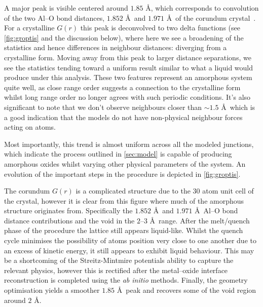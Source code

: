 A major peak is visible centered around $1.85$ \AA, which corresponds to convolution of the two Al--O bond distances, $1.852$ \AA\ and $1.971$ \AA\ of the corundum crystal~\cite{Ishizawa1980}.
For a crystalline $G(r)$ this peak is deconvolved to two delta functions (see \cref{fig:groptis} and the discussion below), where here we see a broadening of the statistics and hence differences in neighbour distances: diverging from a crystalline form.
Moving away from this peak to larger distance separations, we see the statistics tending toward a uniform result similar to what a liquid would produce under this analysis.
These two features represent an amorphous system quite well, as close range order suggests a connection to the crystalline form whilst long range order no longer agrees with such periodic conditions.
It's also significant to note that we don't observe neighbours closer than $\sim\!1.5$ \AA\ which is a good indication that the models do not have non-physical neighbour forces acting on atoms.

Most importantly, this trend is almost uniform across all the modeled junctions, which indicate the process outlined in \cref{sec:model} is capable of producing amorphous oxides whilst varying other physical parameters of the system.
An evolution of the important steps in the procedure is depicted in \cref{fig:groptis}.

The corundum $G(r)$  is a complicated structure due to the 30 atom unit cell of the crystal, however it is clear from this figure where much of the amorphous structure originates from.
Specifically the $1.852$ \AA\ and $1.971$ \AA\ Al--O bond distance contributions and the void in the $2$--$3$ \AA\ range.
After the melt/quench phase of the procedure  the lattice still appears liquid-like.
Whilst the quench cycle minimises the possibility of atoms position very close to one another due to an excess of kinetic energy, it still appears to exhibit liquid behaviour.
This may be a shortcoming of the Streitz-Mintmire potentials ability to capture the relevant physics, however this is rectified after the metal--oxide interface reconstruction is completed  using the \textit{ab initio} methods.
Finally, the geometry optimisation  yields a smoother $1.85$ \AA\ peak and recovers some of the void region around $2$ \AA.

